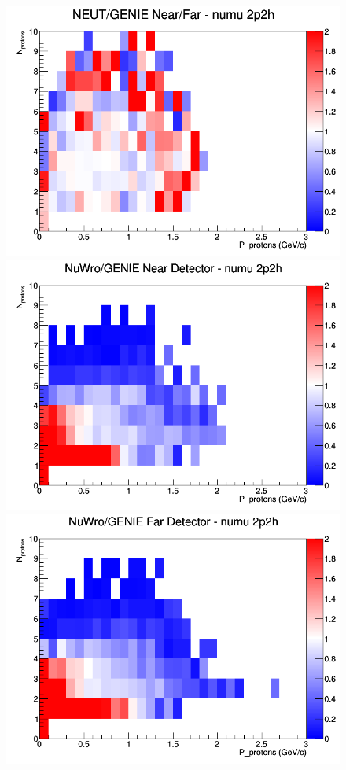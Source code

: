 \documentclass[12pt]{article}
\begin{document}
\begin{figure}[h]
\endminipage
{}
\includegraphics[width=\linewidth]{N_P/nominal/protons/ratios/2p2h_NEUT_GENIE_numu_NF_N_P.png}
\endminipage
\newline
{}
\includegraphics[width=\linewidth]{N_P/nominal/protons/ratios/2p2h_NuWro_GENIE_numu_near_N_P.png}
\endminipage
{}
\includegraphics[width=\linewidth]{N_P/nominal/protons/ratios/2p2h_NuWro_GENIE_numu_far_N_P.png}

\end{figure}
\end{document}
